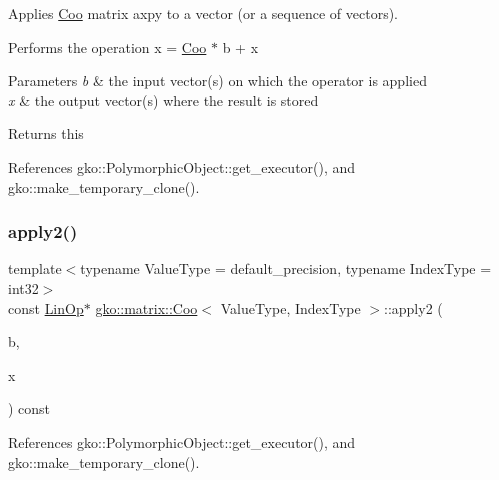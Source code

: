 Applies \hyperlink{classgko_1_1matrix_1_1Coo}{Coo} matrix axpy to a vector (or a sequence of vectors). 

Performs the operation x = \hyperlink{classgko_1_1matrix_1_1Coo}{Coo} $\ast$ b + x


\begin{DoxyParams}{Parameters}
{\em b} & the input vector(s) on which the operator is applied \\
\hline
{\em x} & the output vector(s) where the result is stored\\
\hline
\end{DoxyParams}
\begin{DoxyReturn}{Returns}
this 
\end{DoxyReturn}


References gko\+::\+Polymorphic\+Object\+::get\+\_\+executor(), and gko\+::make\+\_\+temporary\+\_\+clone().

\mbox{\label{classgko_1_1matrix_1_1Coo_a48b3fd46edc8b1770f2800e94871eb41}} 
\subsubsection{\texorpdfstring{apply2()}{apply2()}\hspace{0.1cm}{\footnotesize\ttfamily [2/4]}}
{\footnotesize\ttfamily template$<$typename Value\+Type = default\+\_\+precision, typename Index\+Type = int32$>$ \\
const \hyperlink{classgko_1_1LinOp}{Lin\+Op}$\ast$ \hyperlink{classgko_1_1matrix_1_1Coo}{gko\+::matrix\+::\+Coo}$<$ Value\+Type, Index\+Type $>$\+::apply2 (\begin{DoxyParamCaption}\item[{const \hyperlink{classgko_1_1LinOp}{Lin\+Op} $\ast$}]{b,  }\item[{\hyperlink{classgko_1_1LinOp}{Lin\+Op} $\ast$}]{x }\end{DoxyParamCaption}) const\hspace{0.3cm}{\ttfamily [inline]}}







References gko\+::\+Polymorphic\+Object\+::get\+\_\+executor(), and gko\+::make\+\_\+temporary\+\_\+clone().

\mbox{\label{classgko_1_1matrix_1_1Coo_a549dafbe9245e3fcef3b02c4d6914c84}} 
